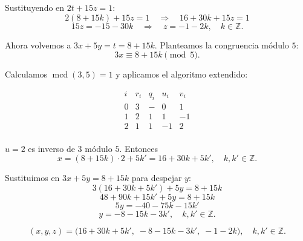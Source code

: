 \documentclass[a4paper,12pt]{article}
\begin{document}
\begin{ejercicio}[title=Ejercicio 33]

Sustituyendo en $2t + 15z = 1$:
\[
2(8+15k) + 15z = 1 \quad\Rightarrow\quad 16 + 30k + 15z = 1
\]
\[
15z = -15 - 30k \quad\Rightarrow\quad z = -1 - 2k,\quad k\in\mathbb{Z}.
\]

Ahora volvemos a $3x + 5y = t = 8 + 15k$. Planteamos la congruencia módulo $5$:
\[
3x \equiv 8 + 15k \pmod{5}.
\]

Calculamos $\operatorname{mcd}(3,5)=1$ y aplicamos el algoritmo extendido:

\[
\begin{array}{c|c|c|c|c}
i & r_i & q_i & u_i & v_i \\ \hline
0 & 3 & - & 0 & 1 \\
1 & 2 & 1 & 1 & -1 \\
2 & \boxed{1} & 1 & -1 & 2 \\
\end{array}
\]

$u=2$ es inverso de $3$ módulo $5$. Entonces
\[
x = (8+15k)\cdot 2 + 5k' = 16 + 30k + 5k',\quad k,k'\in\mathbb{Z}.
\]

Sustituimos en $3x + 5y = 8 + 15k$ para despejar $y$:
\[
3(16 + 30k + 5k') + 5y = 8 + 15k
\]
\[
48 + 90k + 15k' + 5y = 8 + 15k
\]
\[
5y = -40 - 75k - 15k'
\]
\[
y = -8 - 15k - 3k',\quad k,k'\in\mathbb{Z}.
\]

\[
\boxed{(x,y,z)=\bigl(16 + 30k + 5k',\; -8 - 15k - 3k',\; -1 - 2k\bigr),\quad k,k'\in\mathbb{Z}.}
\]

\end{ejercicio}
\end{document}

